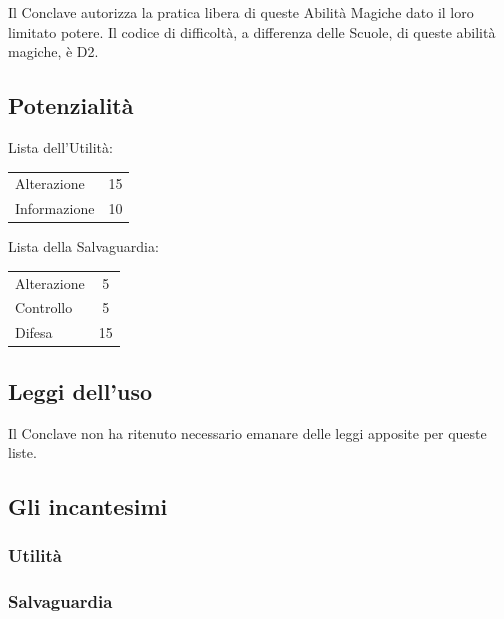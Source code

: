 Il Conclave autorizza la pratica libera di queste
Abilit\`a Magiche dato il loro limitato potere. Il codice di
difficolt\`a, a differenza delle Scuole, di queste abilit\`a
magiche, \`e D2. 

\subsection{Potenzialit\`a}  

\noindent
Lista dell'Utilit\`a: 

\begin{tabular}{lc}
Alterazione& 15 \\
Informazione& 10 \\
\end{tabular}
\bigskip

\noindent Lista della Salvaguardia: 

\begin{tabular}{lc}
Alterazione& 5\\
Controllo& 5 \\
Difesa& 15\\ 
\end{tabular}

\subsection{Leggi dell'uso} 

Il Conclave non ha
ritenuto necessario emanare delle leggi apposite per queste liste.

\subsection{Gli incantesimi}

\subsubsection{Utilit\`a}


\subsubsection{Salvaguardia}


